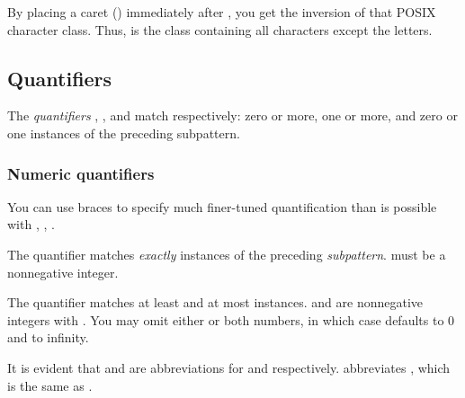 {

By placing a caret (\p{^}) immediately after
\p{[:}, you get the inversion of that POSIX
character class.  Thus, \p{[:^alpha]}
is the class containing all characters
except the letters.

\subsection{Quantifiers}

The {\em quantifiers} \p{*}, \p{+}, and
 match respectively: zero or more, one or more,
and zero or one instances of the preceding subpattern.


\subsubsection{Numeric quantifiers}

You can use braces to specify much finer-tuned
quantification than is possible with \p{*}, \p{+}, .

The quantifier  matches {\em exactly} 
instances of the preceding {\em subpattern}.  
must be a nonnegative integer.

The quantifier  matches at least 
and at most  instances.   and
 are nonnegative integers with .  You may omit either or both numbers, in which case
 defaults to 0 and  to
infinity.

It is evident that \p{+} and  are abbreviations
for  and  respectively.
\p{*} abbreviates \p{{,}}, which is the same
as .

}
